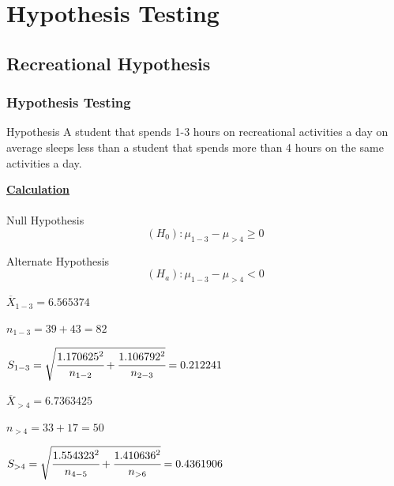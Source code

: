 \documentclass[11pt,]{beamer}
\begin{document}


\section{Hypothesis Testing}

\subsection{Recreational Hypothesis}

\begin{frame}

    \frametitle{Hypothesis Testing}
    
    \begin{block}{Hypothesis}
    A student that spends 1-3 hours on recreational activities a day on average sleeps less than a student that spends more than 4 hours on the same activities a day. 
    \end{block}

    \textbf{\underline{Calculation}}\\
    \\
    Null Hypothesis
    \begin{equation}
         (H_0) :  \mu_{1-3} - \mu_{>4} \geq 0
    \end{equation}
    
    \bigskip
    
    Alternate Hypothesis
    \begin{equation}
        (H_a) : \mu_{1-3} - \mu_{>4} < 0
    \end{equation}

\end{frame}

\begin{frame}

$\overline{X}_{1-3} = 6.565374$

\bigskip

$n_{1-3} = 39 + 43 = 82$

\bigskip

$S_{1-3} = \sqrt{\cfrac{1.170625^2}{n_{1-2}}+ \cfrac{1.106792^2}{n_{2-3}}} = 0.212241$

\bigskip

$\overline{X}_{>4} = 6.7363425$

\bigskip

$n_{>4} = 33 + 17 = 50$

\bigskip

$S_{>4} = \sqrt{\cfrac{1.554323^2}{n_{4-5}}+ \cfrac{1.410636^2}{n_{>6}}} = 0.4361906$

\end{frame}
\end{document}
